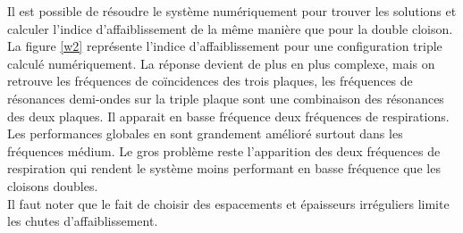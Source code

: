 \documentclass[12pt,foolscap]{report}
\begin{document}
	
	Il est possible de résoudre le système numériquement pour trouver les solutions et calculer l'indice d'affaiblissement de la même manière que pour la double cloison. La figure \ref{w2} représente l'indice d'affaiblissement pour une configuration triple calculé numériquement. La réponse devient de plus en plus complexe, mais on retrouve les fréquences de coïncidences des trois plaques, les fréquences de résonances demi-ondes sur la triple plaque sont une combinaison des résonances des deux plaques. Il apparait en basse fréquence deux fréquences de respirations.\\
	Les performances globales en sont grandement amélioré surtout dans les fréquences médium. Le gros problème reste l'apparition des deux fréquences de respiration qui rendent le système moins performant en basse fréquence que les cloisons doubles.\\ Il faut noter que le fait de choisir des espacements et épaisseurs irréguliers limite les chutes d'affaiblissement.
	
\end{document}
